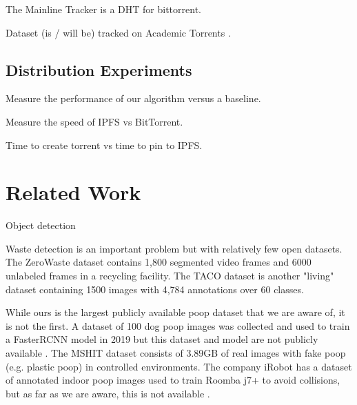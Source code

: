 \documentclass[10pt,twocolumn,letterpaper]{article}
\begin{document}


The Mainline Tracker is a DHT for bittorrent.



Dataset (is / will be) tracked on Academic Torrents \cite{academic_torrents_Cohen2014}.


\subsection{Distribution Experiments}

Measure the performance of our algorithm versus a baseline.

Measure the speed of IPFS vs BitTorrent.

Time to create torrent vs time to pin to IPFS.

\section{Related Work}

Object detection

Waste detection is an important problem but with relatively few open datasets.
The ZeroWaste dataset \cite{bashkirova_zerowaste_2022} contains 1,800 segmented
video frames and 6000 unlabeled frames in a recycling facility.
The TACO dataset \cite{proenca_taco_2020} is another "living" dataset
containing 1500 images with 4,784 annotations over 60 classes.


While ours is the largest publicly available poop dataset that we are aware of,
it is not the first.
A dataset of 100 dog poop images was collected and used to train a FasterRCNN
model in 2019 but this dataset and model are not publicly available \cite{neeraj_madan_dog_2019}.
The MSHIT dataset \cite{mshit_2020} consists of 3.89GB of real images with fake
poop (e.g. plastic poop) in controlled environments.
The company iRobot has a dataset of annotated indoor poop images used to train
Roomba j7+ to avoid collisions, but as far as we are aware, this is not
available \cite{roomba_2021}.
\end{document}
